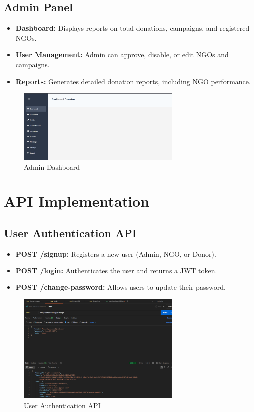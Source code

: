 \subsection{Admin Panel}
\begin{itemize}
    \item \textbf{Dashboard:} Displays reports on total donations, campaigns, and registered NGOs.
    \item \textbf{User Management:} Admin can approve, disable, or edit NGOs and campaigns.
    \item \textbf{Reports:} Generates detailed donation reports, including NGO performance.
\end{itemize}
\begin{figure}[h]
    \centering
    \includegraphics[width=0.7\textwidth]{images/admin_dashboard.png}
    \caption{Admin Dashboard}
    \label{fig: admin dashboard}
\end{figure}

\section{API Implementation}
\subsection{User Authentication API}
\begin{itemize}
    \item \textbf{POST /signup:} Registers a new user (Admin, NGO, or Donor).
    \item \textbf{POST /login:} Authenticates the user and returns a JWT token.
    \item \textbf{POST /change-password:} Allows users to update their password.
\end{itemize}
\begin{figure}[h]
    \centering
    \includegraphics[width=0.7\textwidth]{images/User_Authentication_API.png}
    \caption{User Authentication API}
    \label{fig: User Authentication API}
\end{figure}

